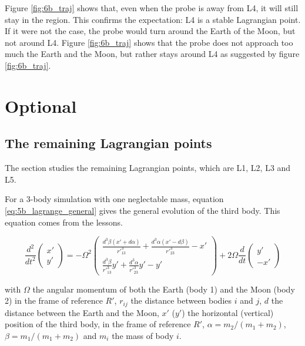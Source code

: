 \documentclass[a4paper,12pt,twoside]{article}
\begin{document}
Figure \ref{fig:6b_traj} shows that, even when the probe is away from L4, it will still stay in the region.
This confirms the expectation: L4 is a stable Lagrangian point.
If it were not the case, the probe would turn around the Earth of the Moon, but not around L4.
Figure \ref{fig:6b_traj} shows that the probe does not approach too much the Earth and the Moon, but rather stays around L4 as suggested by figure \ref{fig:6b_traj}.





\section{Optional}
\subsection{The remaining Lagrangian points}
The section studies the remaining Lagrangian points, which are L1, L2, L3 and L5.

For a 3-body simulation with one neglectable mass, equation \eqref{eq:5b_lagrange_general} gives the general evolution of the third body.
This equation comes from the lessons.

\begin{equation}
  \frac{d^2}{dt^2}
  \begin{pmatrix}
    x' \\
    y'
  \end{pmatrix}
  = -\Omega^2
  \begin{pmatrix}
    \frac{d^3\beta(x' + d\alpha)}{r'^3_{13}} + \frac{d^3\alpha(x' - d\beta)}{r'^3_{23}} - x'\\
    \frac{d^3\beta}{r'^3_{13}}y' + \frac{d^3\alpha}{r'^3_{23}}y' - y'
  \end{pmatrix}
  + 2\Omega\frac{d}{dt}
  \begin{pmatrix}
    y' \\
    -x'
  \end{pmatrix}
  \label{eq:5b_lagrange_general}
\end{equation}

with $\Omega$ the angular momentum of both the Earth (body 1) and the Moon (body 2) in the frame of reference $R'$, $r_{ij}$ the distance between bodies $i$ and $j$, $d$ the distance between the Earth and the Moon, $x'$ ($y'$) the horizontal (vertical) position of the third body, in the frame of reference $R'$, $\alpha = m_2/(m_1 + m_2)$, $\beta = m_1/(m_1 + m_2)$ and $m_i$ the mass of body $i$.\\
\end{document}
